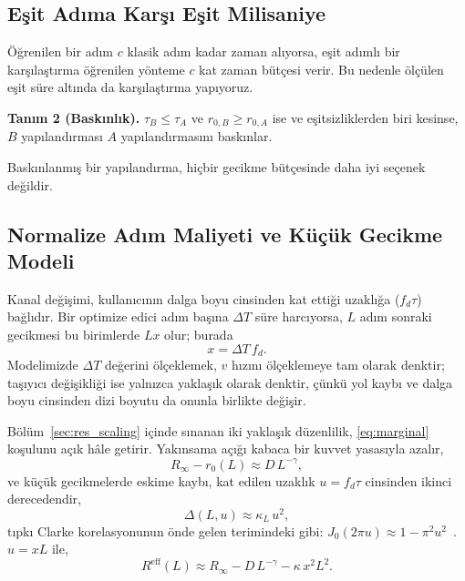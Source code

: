 \subsection{Eşit Adıma Karşı Eşit Milisaniye}
Öğrenilen bir adım $c$ klasik adım kadar zaman alıyorsa, eşit adımlı bir karşılaştırma öğrenilen yönteme $c$ kat zaman bütçesi verir. Bu nedenle ölçülen eşit süre altında da karşılaştırma yapıyoruz.

\textbf{Tanım 2 (Baskınlık).} $\tau_B\le\tau_A$ ve $r_{0,B}\ge r_{0,A}$ ise ve eşitsizliklerden biri kesinse, $B$ yapılandırması $A$ yapılandırmasını baskınlar.

Baskınlanmış bir yapılandırma, hiçbir gecikme bütçesinde daha iyi seçenek değildir.

\subsection{Normalize Adım Maliyeti ve Küçük Gecikme Modeli}
Kanal değişimi, kullanıcının dalga boyu cinsinden kat ettiği uzaklığa ($f_d\tau$) bağlıdır. Bir optimize edici adım başına $\Delta T$ süre harcıyorsa, $L$ adım sonraki gecikmesi bu birimlerde $Lx$ olur; burada
\begin{equation}
    x = \Delta T\, f_d .
    \label{eq:x}
\end{equation}
Modelimizde $\Delta T$ değerini ölçeklemek, $v$ hızını ölçeklemeye tam olarak denktir; taşıyıcı değişikliği ise yalnızca yaklaşık olarak denktir, çünkü yol kaybı ve dalga boyu cinsinden dizi boyutu da onunla birlikte değişir.

Bölüm~\ref{sec:res_scaling} içinde sınanan iki yaklaşık düzenlilik, \eqref{eq:marginal} koşulunu açık hâle getirir. Yakınsama açığı kabaca bir kuvvet yasasıyla azalır,
\begin{equation}
    R_\infty - r_0(L) \approx D\,L^{-\gamma},
    \label{eq:conv_law}
\end{equation}
ve küçük gecikmelerde eskime kaybı, kat edilen uzaklık $u=f_d\tau$ cinsinden ikinci derecedendir,
\begin{equation}
    \Delta(L,u) \approx \kappa_L\, u^2 ,
    \label{eq:aging_law}
\end{equation}
tıpkı Clarke korelasyonunun önde gelen terimindeki gibi: $J_0(2\pi u)\approx 1-\pi^2u^2$~\cite{Clarke1968BSTJ}. $u = xL$ ile,
\begin{equation}
    R^{\mathrm{eff}}(L) \approx R_\infty - D\,L^{-\gamma} - \kappa\, x^2 L^2 .
    \label{eq:reff_model}
\end{equation}

